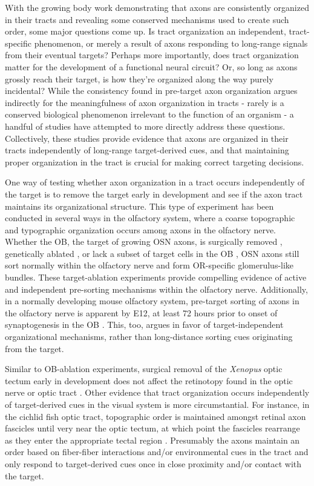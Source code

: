 \label{sec:TractOrderIndependOfTargeting}
With the growing body work demonstrating that axons are consistently organized in their tracts and revealing some conserved mechanisms used to create such order, some major questions come up.
Is tract organization an independent, tract-specific phenomenon, or merely a result of axons responding to long-range signals from their eventual targets?
Perhaps more importantly, does tract organization matter for the development of a functional neural circuit?
Or, so long as axons grossly reach their target, is how they're organized along the way purely incidental?
While the consistency found in pre-target axon organization argues indirectly for the meaningfulness of axon organization in tracts - rarely is a conserved biological phenomenon irrelevant to the function of an organism - a handful of studies have attempted to more directly address these questions.
Collectively, these studies provide evidence that axons are organized in their tracts independently of long-range target-derived cues, and that maintaining proper organization in the tract is crucial for making correct targeting decisions.

One way of testing whether axon organization in a tract occurs independently of the target is to remove the target early in development and see if the axon tract maintains its organizational structure.
This type of experiment has been conducted in several ways in the olfactory system, where a coarse topographic and typographic organization occurs among axons in the olfactory nerve.
Whether the OB, the target of growing OSN axons, is surgically removed \cite{graziadei1978regeneration}, genetically ablated \cite{stjohn2003sorting}, or lack a subset of target cells in the OB \cite{bulfone1998olfactory}, OSN axons still sort normally within the olfactory nerve and form OR-specific glomerulus-like bundles.
These target-ablation experiments provide compelling evidence of active and independent pre-sorting mechanisms within the olfactory nerve.
Additionally, in a normally developing mouse olfactory system, pre-target sorting of axons in the olfactory nerve is apparent by E12, at least 72 hours prior to onset of synaptogenesis in the OB \cite{miller2010axon}.
This, too, argues in favor of target-independent organizational mechanisms, rather than long-distance sorting cues originating from the target.

Similar to OB-ablation experiments, surgical removal of the \emph{Xenopus} optic tectum early in development does not affect the retinotopy found in the optic nerve or optic tract \cite{reh1983organization}.
Other evidence that tract organization occurs independently of target-derived cues in the visual system is more circumstantial.
For instance, in the cichlid fish optic tract, topographic order is maintained amongst retinal axon fascicles until very near the optic tectum, at which point the fascicles rearrange as they enter the appropriate tectal region \cite{scholes1979nerve}.
Presumably the axons maintain an order based on fiber-fiber interactions and/or environmental cues in the tract and only respond to target-derived cues once in close proximity and/or contact with the target.


